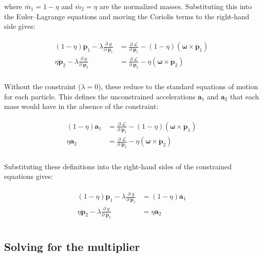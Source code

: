 \documentclass[]{article}
\newcommand{\pd}[2]{\frac{\partial\;#1}{\partial\;#2}}
\begin{document}
where $\bar{m}_1 = 1-\eta$ and $\bar{m}_2 = \eta$ are the normalized masses.  Substituting this into the Euler--Lagrange equations and moving the Coriolis terms to the right-hand side gives:

\begin{align}
\begin{split}
    (1-\eta) \ddot{\mathbf{p}}_1 - \lambda \pd{g}{\mathbf{p}_1} &= \pd{\mathcal{L}}{\mathbf{p}_1} - (1-\eta) \left(\boldsymbol{\omega} \times \dot{\mathbf{p}}_1\right) \\
    \eta \ddot{\mathbf{p}}_2 - \lambda \pd{g}{\mathbf{p}_2} &= \pd{\mathcal{L}}{\mathbf{p}_2} - \eta \left(\boldsymbol{\omega} \times \dot{\mathbf{p}}_2\right) \\
\end{split}
\end{align}

Without the constraint ($\lambda = 0$), these reduce to the standard equations of motion for each particle.  This defines the unconstrained accelerations $\mathbf{a}_1$ and $\mathbf{a}_2$ that each mass would have in the absence of the constraint:

\begin{align}
\begin{split}
    (1-\eta) \mathbf{a}_1 &= \pd{\mathcal{L}}{\mathbf{p}_1} - (1-\eta) \left(\boldsymbol{\omega} \times \dot{\mathbf{p}}_1\right) \\
    \eta \mathbf{a}_2 &= \pd{\mathcal{L}}{\mathbf{p}_2} - \eta \left(\boldsymbol{\omega} \times \dot{\mathbf{p}}_2\right) \\
\end{split}
\end{align}

Substituting these definitions into the right-hand sides of the constrained equations gives:

\begin{align}
\begin{split}
    (1-\eta) \ddot{\mathbf{p}}_1 - \lambda \pd{g}{\mathbf{p}_1} &= (1-\eta) \mathbf{a}_1 \\
    \eta \ddot{\mathbf{p}}_2 - \lambda \pd{g}{\mathbf{p}_2} &= \eta \mathbf{a}_2 \\
\end{split}
\end{align}

\subsection{Solving for the multiplier}
\end{document}
